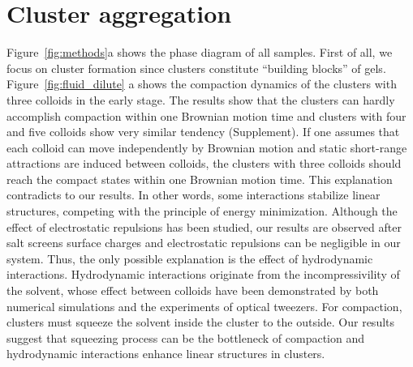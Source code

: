 \section{Cluster aggregation} %
Figure~\ref{fig:methods}a shows the phase diagram of all samples.
First of all, we focus on cluster formation since clusters constitute ``building blocks'' of gels.
Figure~\ref{fig:fluid_dilute} a shows the compaction dynamics of the clusters with three colloids in the early stage.
The results show that the clusters can hardly accomplish compaction within one Brownian motion time and clusters with four and five colloids show very similar tendency (Supplement).
If one assumes that each colloid can move independently by Brownian motion and static short-range attractions are induced between colloids, the clusters with three colloids should reach the compact states within one Brownian motion time.
This explanation contradicts to our results.
In other words, some interactions stabilize linear structures, competing with the principle of energy minimization.
Although the effect of electrostatic repulsions has been studied, our results are observed after salt screens surface charges and electrostatic repulsions can be negligible in our system.
Thus, the only possible explanation is the effect of hydrodynamic interactions.
Hydrodynamic interactions originate from the incompressivility of the solvent, whose effect between colloids have been demonstrated by both numerical simulations and the experiments of optical tweezers.
For compaction, clusters must squeeze the solvent inside the cluster to the outside.
Our results suggest that squeezing process can be the bottleneck of compaction and hydrodynamic interactions enhance linear structures in clusters.



